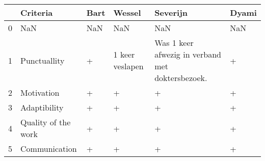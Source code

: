 \begin{tabular}{llllll}
\toprule
{} &             Criteria & Bart  &           Wessel &                                           Severijn & Dyami \\
\midrule
0 &                  NaN &   NaN &              NaN &                                                NaN &   NaN \\
1 &         Punctuallity &     + &  1 keer veslapen &  Was 1 keer afwezig in verband met doktersbezoek.  &     + \\
2 &           Motivation &     + &                + &                                                  + &     + \\
3 &         Adaptibility &     + &                + &                                                  + &     + \\
4 &  Quality of the work &     + &                + &                                                  + &     + \\
5 &        Communication &     + &                + &                                                  + &     + \\
\bottomrule
\end{tabular}
